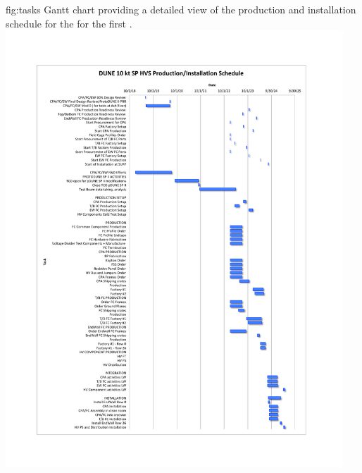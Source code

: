 \begin{dunefigure}{fig:tasks}{
Gantt chart providing a detailed view of the production and installation schedule for the  for the first .}
\includegraphics[width=0.95\textwidth]{graphics/HVS-GANTT-new.pdf}
\end{dunefigure}

